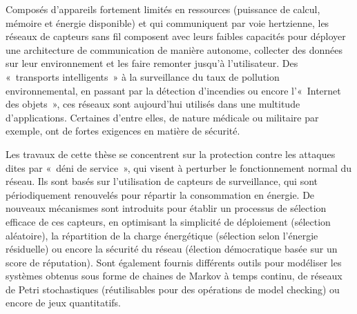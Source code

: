 Composés d'appareils fortement limités en ressources (puissance de calcul, mémoire et énergie disponible) et qui communiquent par voie hertzienne, les réseaux de capteurs sans fil composent avec leurs faibles capacités pour déployer une architecture de communication de manière autonome, collecter des données sur leur environnement et les faire remonter jusqu'à l'utilisateur.
Des « transports intelligents » à la surveillance du taux de pollution environnemental, en passant par la détection d'incendies ou encore l'« Internet des objets », ces réseaux sont aujourd'hui utilisés dans une multitude d'applications.
Certaines d'entre elles, de nature médicale ou militaire par exemple, ont de fortes exigences en matière de sécurité.

Les travaux de cette thèse se concentrent sur la protection contre les attaques dites par « déni de service », qui visent à perturber le fonctionnement normal du réseau.
Ils sont basés sur l'utilisation de capteurs de surveillance, qui sont périodiquement renouvelés pour répartir la consommation en énergie.
De nouveaux mécanismes sont introduits pour établir un processus de sélection efficace de ces capteurs, en optimisant la simplicité de déploiement (sélection aléatoire), la répartition de la charge énergétique (sélection selon l'énergie résiduelle) ou encore la sécurité du réseau (élection démocratique basée sur un score de réputation).
Sont également fournis différents outils pour modéliser les systèmes obtenus sous forme de chaines de Markov à temps continu, de réseaux de Petri stochastiques (réutilisables pour des opérations de model checking) ou encore de jeux quantitatifs.
